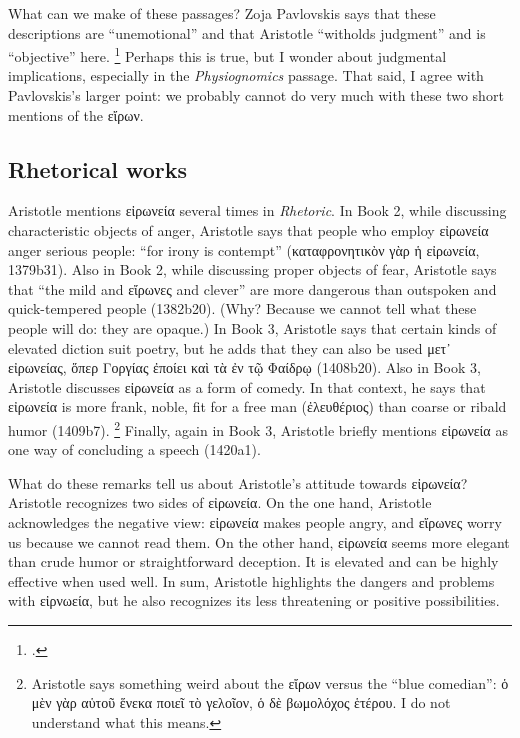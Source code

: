 \documentclass[12pt,letterpaper]{article}
\begin{document}
What can we make of these passages?
Zoja Pavlovskis says that these descriptions are ``unemotional'' and that Aristotle ``witholds judgment'' and is ``objective'' here.%
\footcite[][23]{pavlovskis-aristotle-horace-ironic-man-1968}
Perhaps this is true, but I wonder about judgmental implications, especially in the \textit{Physiognomics} passage.
That said, I agree with Pavlovskis's larger point: we probably cannot do very much with these two short mentions of the \textgreek{εἴρων}.

\subsection*{Rhetorical works}

Aristotle mentions \textgreek{εἰρωνεία} several times in \textit{Rhetoric}.
In Book 2, while discussing characteristic objects of anger, Aristotle says that people who employ \textgreek{εἰρωνεία} anger serious people: ``for irony is contempt'' (\textgreek{καταφρονητικὸν γὰρ ἡ εἰρωνεία}, 1379b31).
Also in Book 2, while discussing proper objects of fear, Aristotle says that ``the mild and \textgreek{εἴρωνες} and clever'' are more dangerous than outspoken and quick-tempered people (1382b20).
(Why?
Because we cannot tell what these people will do: they are opaque.)
In Book 3, Aristotle says that certain kinds of elevated diction suit poetry, but he adds that they can also be used \textgreek{μετ᾿ εἰρωνείας, ὅπερ Γοργίας ἐποίει καὶ τὰ ἐν τῷ Φαίδρῳ} (1408b20).
Also in Book 3, Aristotle discusses \textgreek{εἰρωνεία} as a form of comedy.
In that context, he says that \textgreek{εἰρωνεία} is more frank, noble, fit for a free man (\textgreek{ἐλευθέριος}) than coarse or ribald humor (1409b7).%
\footnote{Aristotle says something weird about the \textgreek{εἴρων} versus the ``blue comedian'': \textgreek{ὁ μὲν γὰρ αὑτοῦ ἕνεκα ποιεῖ τὸ γελοῖον, ὁ δὲ βωμολόχος ἑτέρου}. %
I do not understand what this means.}
Finally, again in Book 3, Aristotle briefly mentions \textgreek{εἰρωνεία} as one way of concluding a speech (1420a1).

What do these remarks tell us about Aristotle's attitude towards \textgreek{εἰρωνεία}?
Aristotle recognizes two sides of \textgreek{εἰρωνεία}.
On the one hand, Aristotle acknowledges the negative view: \textgreek{εἰρωνεία} makes people angry, and \textgreek{εἴρωνες} worry us because we cannot read them.
On the other hand, \textgreek{εἰρωνεία} seems more elegant than crude humor or straightforward deception.
It is elevated and can be highly effective when used well.
In sum, Aristotle highlights the dangers and problems with \textgreek{εἰρνωεία}, but he also recognizes its less threatening or positive possibilities.
\end{document}
